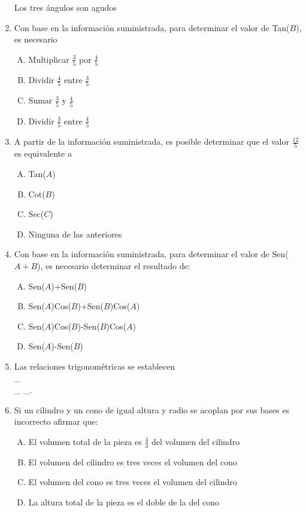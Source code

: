 \begin{enumerate}
Los tres ángulos son agudos

\newpage
\item  Con base en la información suministrada, para determinar el valor de Tan($B$), es necesario\label{yolma-14}\\

\begin{enumerate}[(A)]
\item  Multiplicar $\frac35$ por $\frac45$
\item Dividir $\frac45$ entre $\frac35$
\item Sumar $\frac35$ y $\frac45$
\item Dividir $\frac35$ entre $\frac45$
\end{enumerate}


\item A partir de la información suministrada, es posible determinar que el valor $\frac{12}{5}$ es equivalente a  \label{yolma-15}\\
\begin{enumerate}[(A)]
\item  Tan($A$)
\item Cot($B$)
\item Sec($C$)
\item Ninguna de las anteriores
\end{enumerate}

\item  Con base en la información suministrada, para determinar el valor de Sen($A+B$), es necesario determinar el resultado de: \label{yolma-16}
\begin{enumerate}[(A)]
\item  Sen($A$)+Sen($B$)
\item Sen($A$)Cos($B$)+Sen($B$)Cos($A$)
\item Sen($A$)Cos($B$)-Sen($B$)Cos($A$)
\item Sen($A$)-Sen($B$)
\end{enumerate}


\item  Las relaciones trigonométricas se establecen\label{yolma-17}\hrulefill\\
\_\hrulefill\\
\_\hrulefill
\_\hrulefill.



\item Si un cilindro y un cono de igual altura y radio se acoplan por sus bases es incorrecto afirmar que: \label{yolma-18}
\begin{enumerate}[(A)]
\item  El volumen total de la pieza es $\frac43$ del volumen del cilindro
\item El volumen del cilindro es tres veces el volumen del cono
\item El volumen del cono es tres veces el volumen del cilindro
\item La altura total de la pieza es el doble de la del cono
\end{enumerate}


\end{enumerate}
